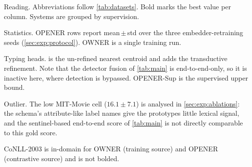 \begin{table}[tbp]
\begin{threeparttable}
\begin{tabular}{l*{13}{c}c}
\bottomrule
\end{tabular}
\begin{tablenotes}[flushleft]
\footnotesize
\item[] Reading. Abbreviations follow \autoref{tab:datasets}. Bold marks the best value per column. Systems are grouped by supervision.
\item[] Statistics. OPENER rows report mean\,$\pm$\,std over the three embedder-retraining seeds (\autoref{sec:exp:protocol}). OWNER is a single training run.
\item[] Typing heads. \zsind is the un-refined nearest centroid and \zstr adds the transductive refinement. Note that the detector fusion of \autoref{tab:main} is end-to-end-only, so it is inactive here, where detection is bypassed. OPENER-Sup is the supervised upper bound.
\item[] Outlier. The low \zsind MIT-Movie cell ($16.1 \pm 7.1$) is analysed in \autoref{sec:exp:ablations}: the schema's attribute-like label names give the prototypes little lexical signal, and the sentinel-based end-to-end score of \autoref{tab:main} is not directly comparable to this gold score.
\item[$\dagger$] CoNLL-2003 is in-domain for OWNER (training source) and OPENER (contrastive source) and is not bolded.
\end{tablenotes}
\end{threeparttable}
\end{table}

